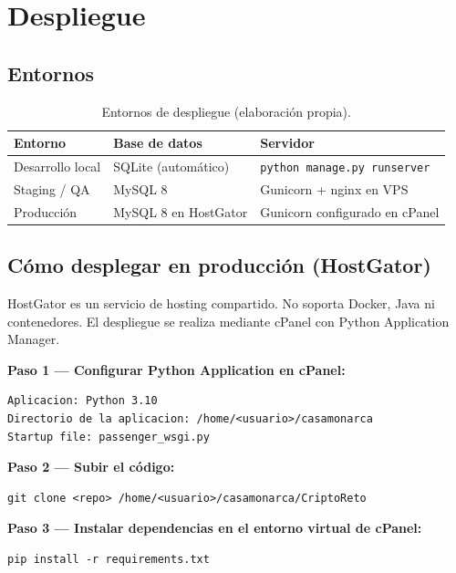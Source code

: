 \documentclass[10pt,letterpaper]{report}
\begin{document}
\chapter{Despliegue}

\section{Entornos}

\begin{table}[H]
\centering
\caption{Entornos de despliegue (elaboración propia).}
\label{tab:entornos}
\begin{tabularx}{\textwidth}{l X X}
\toprule
\textbf{Entorno} & \textbf{Base de datos} & \textbf{Servidor} \\
\midrule
Desarrollo local & SQLite (automático) & \texttt{python manage.py runserver} \\
Staging / QA & MySQL 8 & Gunicorn + nginx en VPS \\
Producción & MySQL 8 en HostGator & Gunicorn configurado en cPanel \\
\bottomrule
\end{tabularx}
\end{table}

\section{Cómo desplegar en producción (HostGator)}

\begin{alerta}
HostGator es un servicio de hosting compartido. No soporta Docker, Java ni contenedores. El despliegue se realiza mediante cPanel con Python Application Manager.
\end{alerta}

\textbf{Paso 1 — Configurar Python Application en cPanel:}
\begin{lstlisting}
Aplicacion: Python 3.10
Directorio de la aplicacion: /home/<usuario>/casamonarca
Startup file: passenger_wsgi.py
\end{lstlisting}

\textbf{Paso 2 — Subir el código:}
\begin{lstlisting}
git clone <repo> /home/<usuario>/casamonarca/CriptoReto
\end{lstlisting}

\textbf{Paso 3 — Instalar dependencias en el entorno virtual de cPanel:}
\begin{lstlisting}
pip install -r requirements.txt
\end{lstlisting}
\end{document}
